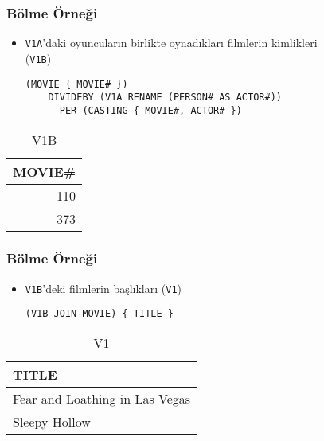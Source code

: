 \documentclass[dvipsnames]{beamer}
\theoremstyle{plain}
\begin{document}
\begin{frame}[fragile]
  \frametitle{Bölme Örneği}

    \begin{itemize}
      \item \texttt{V1A}'daki oyuncuların birlikte oynadıkları filmlerin
        kimlikleri\\
        (\texttt{V1B})

    \begin{lstlisting}
(MOVIE { MOVIE# })
    DIVIDEBY (V1A RENAME (PERSON# AS ACTOR#))
      PER (CASTING { MOVIE#, ACTOR# })
    \end{lstlisting}
   \end{itemize}

    \vspace{-10pt}
    \begin{tiny}
    \begin{table}
      \caption{V1B}
      \begin{tabular}{|r|}\hline
\underline{MOVIE\#}\\[2pt]\hline\hline
                110\\\hline
                373\\\hline
      \end{tabular}
    \end{table}
    \end{tiny}
\end{frame}

\begin{frame}[fragile]
  \frametitle{Bölme Örneği}

    \begin{itemize}
      \item \texttt{V1B}'deki filmlerin başlıkları (\texttt{V1})

    \begin{lstlisting}
(V1B JOIN MOVIE) { TITLE }
    \end{lstlisting}
    \end{itemize}

    \vspace{-10pt}
    \begin{tiny}
    \begin{table}
      \caption{V1}
      \begin{tabular}{|l|}\hline
\underline{TITLE}             \\[2pt]\hline\hline
Fear and Loathing in Las Vegas\\\hline
Sleepy Hollow                 \\\hline
      \end{tabular}
    \end{table}
    \end{tiny}
\end{frame}
\end{document}
